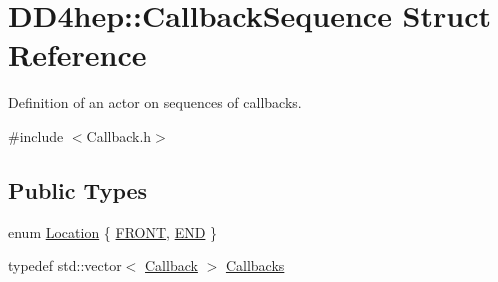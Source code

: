 \hypertarget{struct_d_d4hep_1_1_callback_sequence}{}\section{D\+D4hep\+:\+:Callback\+Sequence Struct Reference}
\label{struct_d_d4hep_1_1_callback_sequence}


Definition of an actor on sequences of callbacks.  




{\ttfamily \#include $<$Callback.\+h$>$}

\subsection*{Public Types}
\begin{DoxyCompactItemize}
\item 
enum \hyperlink{struct_d_d4hep_1_1_callback_sequence_a7753490247479633aed16a2376821ef7}{Location} \{ \hyperlink{struct_d_d4hep_1_1_callback_sequence_a7753490247479633aed16a2376821ef7a3aef5fe72e4b9e6f6f4b20a655e78ef2}{F\+R\+O\+NT}, 
\hyperlink{struct_d_d4hep_1_1_callback_sequence_a7753490247479633aed16a2376821ef7ac39eeb1bcfc1c235ab1d0d9315c310ac}{E\+ND}
 \}
\item 
typedef std\+::vector$<$ \hyperlink{class_d_d4hep_1_1_callback}{Callback} $>$ \hyperlink{struct_d_d4hep_1_1_callback_sequence_a2d9d9488b193731498c4b9cc0fdc4a6b}{Callbacks}
\end{DoxyCompactItemize}

